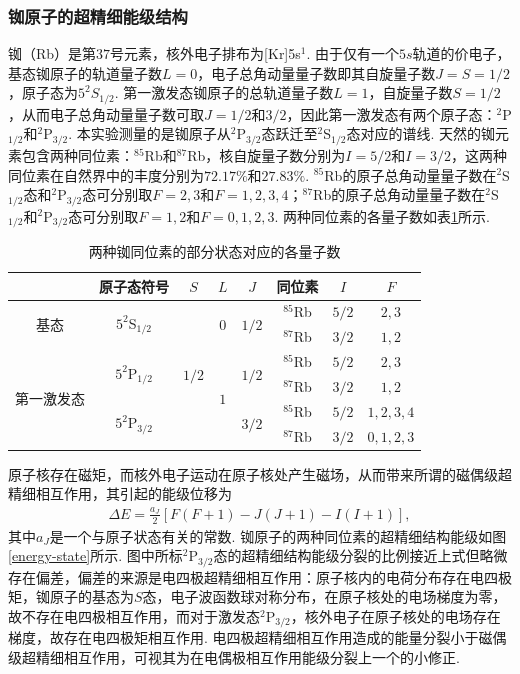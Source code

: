 \documentclass[a4paper, 10pt]{article}
\begin{document}
\begin{multicols}{2}
\subsubsection{铷原子的超精细能级结构}
铷（Rb）是第$37$号元素，核外电子排布为[Kr]5s$^1$. 由于仅有一个$5s$轨道的价电子，基态铷原子的轨道量子数$L=0$，电子总角动量量子数即其自旋量子数$J=S=1/2$，原子态为$5^2S_{1/2}$. 第一激发态铷原子的总轨道量子数$L=1$，自旋量子数$S=1/2$，从而电子总角动量量子数可取$J=1/2$和$3/2$，因此第一激发态有两个原子态：$^2$P$_{1/2}$和$^2$P$_{3/2}$. 本实验测量的是铷原子从$^2$P$_{3/2}$态跃迁至$^2$S$_{1/2}$态对应的谱线. 天然的铷元素包含两种同位素：$^{85}$Rb和$^{87}$Rb，核自旋量子数分别为$I=5/2$和$I=3/2$，这两种同位素在自然界中的丰度分别为$72.17\%$和$27.83\%$. $^{85}$Rb的原子总角动量量子数在$^2$S$_{1/2}$态和$^2$P$_{3/2}$态可分别取$F=2,3$和$F=1,2,3,4$；$^{87}$Rb的原子总角动量量子数在$^2$S$_{1/2}$和$^2$P$_{3/2}$态可分别取$F=1,2$和$F=0,1,2,3$. 两种同位素的各量子数如表\ref{quantum-number}所示.

\begin{table}[H]
    \footnotesize
    \centering
    \caption{两种铷同位素的部分状态对应的各量子数}
    \label{quantum-number}
    \begin{tabular}{|c|c|c|c|c|c|c|c|}
    \hline
     & 原子态符号 & $S$ & $L$ & $J$ & 同位素 & $I$ & $F$ \\ \hline
    \multirow{2}{*}{基态} & \multirow{2}{*}{$5^2$S$_{1/2}$} & \multirow{6}{*}{$1/2$} & \multirow{2}{*}{$0$} & \multirow{2}{*}{$1/2$} & $^{85}$Rb & $5/2$ & $2,3$ \\ \cline{6-8} 
     &  &  &  &  & $^{87}$Rb & $3/2$ & $1,2$ \\ \cline{1-2} \cline{4-8} 
    \multirow{4}{*}{第一激发态} & \multirow{2}{*}{$5^2$P$_{1/2}$} &  & \multirow{4}{*}{$1$} & \multirow{2}{*}{$1/2$} & $^{85}$Rb & $5/2$ & $2,3$ \\ \cline{6-8} 
     &  &  &  &  & $^{87}$Rb & $3/2$ & $1,2$ \\ \cline{2-2} \cline{5-8} 
     & \multirow{2}{*}{$5^2$P$_{3/2}$} &  &  & \multirow{2}{*}{$3/2$} & $^{85}$Rb & $5/2$ & $1,2,3,4$ \\ \cline{6-8} 
     &  &  &  &  & $^{87}$Rb & $3/2$ & $0,1,2,3$ \\ \hline
    \end{tabular}
\end{table}

原子核存在磁矩，而核外电子运动在原子核处产生磁场，从而带来所谓的磁偶级超精细相互作用，其引起的能级位移为
\begin{align}
    \Delta E=\frac{a_J}{2}[F(F+1)-J(J+1)-I(I+1)],
\end{align}
其中$a_J$是一个与原子状态有关的常数. 铷原子的两种同位素的超精细结构能级如图\ref{energy-state}所示. 图中所标$^2$P$_{3/2}$态的超精细结构能级分裂的比例接近上式但略微存在偏差，偏差的来源是电四极超精细相互作用：原子核内的电荷分布存在电四极矩，铷原子的基态为$S$态，电子波函数球对称分布，在原子核处的电场梯度为零，故不存在电四极相互作用，而对于激发态$^2$P$_{3/2}$，核外电子在原子核处的电场存在梯度，故存在电四极矩相互作用. 电四极超精细相互作用造成的能量分裂小于磁偶级超精细相互作用，可视其为在电偶极相互作用能级分裂上一个的小修正.


\end{multicols}
\end{document}
